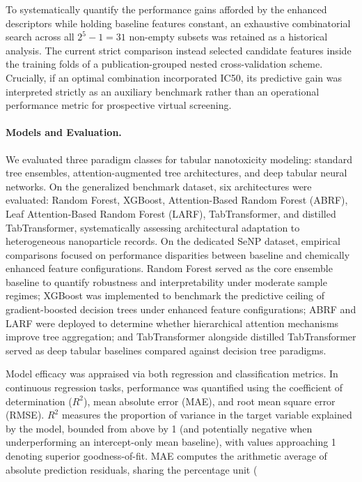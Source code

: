 To systematically quantify the performance gains afforded by the enhanced descriptors while holding baseline features constant, an exhaustive combinatorial search across all $2^5 - 1 = 31$ non-empty subsets was retained as a historical analysis. The current strict comparison instead selected candidate features inside the training folds of a publication-grouped nested cross-validation scheme. Crucially, if an optimal combination incorporated IC50, its predictive gain was interpreted strictly as an auxiliary benchmark rather than an operational performance metric for prospective virtual screening.

\paragraph{Models and Evaluation.}
We evaluated three paradigm classes for tabular nanotoxicity modeling: standard tree ensembles, attention-augmented tree architectures, and deep tabular neural networks. On the generalized benchmark dataset, six architectures were evaluated: Random Forest, XGBoost, Attention-Based Random Forest (ABRF), Leaf Attention-Based Random Forest (LARF), TabTransformer, and distilled TabTransformer, systematically assessing architectural adaptation to heterogeneous nanoparticle records. On the dedicated SeNP dataset, empirical comparisons focused on performance disparities between baseline and chemically enhanced feature configurations. Random Forest served as the core ensemble baseline to quantify robustness and interpretability under moderate sample regimes; XGBoost was implemented to benchmark the predictive ceiling of gradient-boosted decision trees under enhanced feature configurations; ABRF and LARF were deployed to determine whether hierarchical attention mechanisms improve tree aggregation; and TabTransformer alongside distilled TabTransformer served as deep tabular baselines compared against decision tree paradigms.

Model efficacy was appraised via both regression and classification metrics. In continuous regression tasks, performance was quantified using the coefficient of determination ($R^2$), mean absolute error (MAE), and root mean square error (RMSE). $R^2$ measures the proportion of variance in the target variable explained by the model, bounded from above by 1 (and potentially negative when underperforming an intercept-only mean baseline), with values approaching 1 denoting superior goodness-of-fit. MAE computes the arithmetic average of absolute prediction residuals, sharing the percentage unit (%

